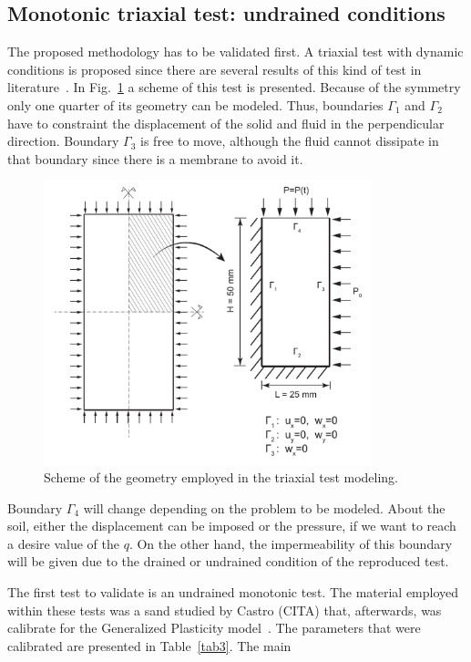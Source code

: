 \documentclass[preprint,12pt,a4paper]{elsarticle}
\begin{document}
\subsection{Monotonic triaxial test: undrained conditions}
\label{sec:31}
The proposed methodology has to be validated first. A triaxial test with dynamic conditions is proposed since there are several results of this kind of test in literature~\cite{PastorZC:90,Zienkiewicz99}. In Fig.~\ref{fig_Geo} a scheme of this test is presented. Because of the symmetry only one quarter of its geometry can be modeled. Thus, boundaries $\Gamma_1$ and $\Gamma_2$ have to constraint the displacement of the solid and fluid in the perpendicular direction. Boundary $\Gamma_3$ is free to move, although the fluid cannot dissipate in that boundary since there is a membrane to avoid it.

\begin{figure}
\centering
\includegraphics[width=0.85\textwidth]{Figs/Geo.pdf}
\caption{Scheme of the geometry employed in the triaxial test modeling.}
\label{fig_Geo}
\end{figure}

Boundary $\Gamma_4$ will change depending on the problem to be modeled. About the soil, either the displacement can be imposed or the pressure, if we want to reach a desire value of the $q$. On the other hand, the impermeability of this boundary will be given due to the drained or undrained condition of the reproduced test.

The first test to validate is an undrained monotonic test. The material employed within these tests was a sand studied by Castro (CITA) that, afterwards, was calibrate for the Generalized Plasticity model~\cite{PastorZC:90,Zienkiewicz99}. The parameters that were calibrated are presented in Table~\ref{tab3}. The main 
\end{document}
